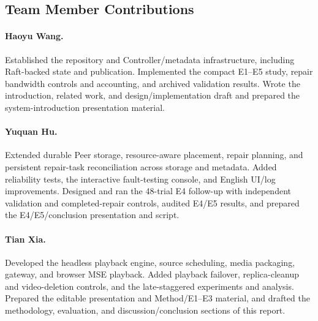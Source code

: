 \begin{samepage}
\section{Team Member Contributions}
\paragraph{Haoyu Wang.}
Established the repository and Controller/metadata infrastructure, including
Raft-backed state and publication. Implemented the compact E1--E5 study,
repair bandwidth controls and accounting, and archived validation results.
Wrote the introduction, related work, and design/implementation draft and
prepared the system-introduction presentation material.

\paragraph{Yuquan Hu.}
Extended durable Peer storage, resource-aware placement, repair planning,
and persistent repair-task reconciliation across storage and metadata.
Added reliability tests, the interactive fault-testing console, and English
UI/log improvements. Designed and ran the 48-trial E4 follow-up with
independent validation and completed-repair controls, audited E4/E5 results,
and prepared the E4/E5/conclusion presentation and script.

\paragraph{Tian Xia.}
Developed the headless playback engine, source scheduling, media packaging,
gateway, and browser MSE playback. Added playback failover, replica-cleanup
and video-deletion controls, and the late-staggered experiments and analysis.
Prepared the editable presentation and Method/E1--E3 material, and drafted
the methodology, evaluation, and discussion/conclusion sections of this
report.
\end{samepage}
